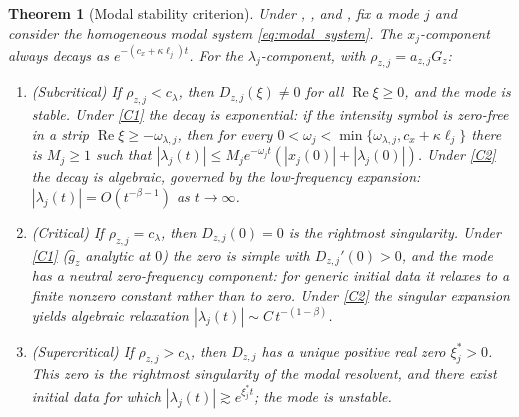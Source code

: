 \documentclass[11pt]{article}
\theoremstyle{plain}
\newtheorem{theorem}{Theorem}[section]
\theoremstyle{definition}
\theoremstyle{remark}
\newcommand{\re}{\operatorname{Re}}
\newcommand{\abs}[1]{\left\lvert #1 \right\rvert}
\newcommand{\Laplace}{\widehat}
\newcommand{\branch}{\rho}
\begin{document}
\begin{theorem}[Modal stability criterion]
\label{thm:modal}
Under , , and , fix a mode $j$ and consider
the homogeneous modal system \eqref{eq:modal_system}. The $x_j$-component always decays as
$e^{-(c_x+\kappa\ell_j)t}$. For the $\lambda_j$-component, with $\branch_{z,j}=a_{z,j}G_z$:
\begin{enumerate}[label=\textup{(\roman*)},leftmargin=2.2em]
\item \emph{(Subcritical)} If $\branch_{z,j}<c_\lambda$, then $D_{z,j}(\xi)\ne0$ for all
$\re\xi\ge0$, and the mode is stable. Under \ref{C1} the decay is exponential: if the intensity
symbol is zero-free in a strip $\re\xi\ge-\omega_{\lambda,j}$, then for every
$0<\omega_j<\min\{\omega_{\lambda,j},c_x+\kappa\ell_j\}$ there is $M_j\ge1$ such that
$\abs{\lambda_j(t)}\le M_j e^{-\omega_j t}(\abs{x_j(0)}+\abs{\lambda_j(0)})$. Under \ref{C2} the
decay is algebraic, governed by the low-frequency expansion:
$\abs{\lambda_j(t)}=O(t^{-\beta-1})$ as $t\to\infty$.
\item \emph{(Critical)} If $\branch_{z,j}=c_\lambda$, then $D_{z,j}(0)=0$ is the rightmost
singularity. Under \ref{C1} ($\Laplace g_z$ analytic at $0$) the zero is simple with
$D_{z,j}'(0)>0$, and the mode has a neutral zero-frequency component: for generic initial data it
relaxes to a finite nonzero constant rather than to zero. Under \ref{C2} the singular expansion
yields algebraic relaxation $\abs{\lambda_j(t)}\sim C\,t^{-(1-\beta)}$.
\item \emph{(Supercritical)} If $\branch_{z,j}>c_\lambda$, then $D_{z,j}$ has a unique positive
real zero $\xi_j^\ast>0$. This zero is the rightmost singularity of the modal resolvent, and there
exist initial data for which $\abs{\lambda_j(t)}\gtrsim e^{\xi_j^\ast t}$; the mode is unstable.
\end{enumerate}
\end{theorem}
\end{document}
